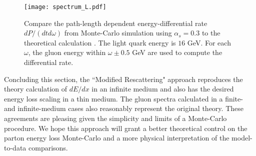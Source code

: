 \documentclass[aps, prc, reprint, amsmath, groupedaddress, nofootinbib]{revtex4-1}
\begin{document}
\begin{figure}
\texttt{[image: spectrum\_L.pdf]}
\caption{Compare the path-length dependent energy-differential rate $dP/(dtd\omega)$ from Monte-Carlo simulation using $\alpha_s = 0.3$ to the theoretical calculation \cite{CaronHuot:2008uh}. The light quark energy is $16$ GeV. For each $\omega$, the gluon energy within $\omega \pm 0.5$ GeV are used to compute the differential rate.}
\label{fig:spectra-L-alphas=0.3}
\end{figure}

Concluding this section, the ``Modified Rescattering" approach reproduces  the theory calculation of $dE/dx$ in an infinite medium and also has the desired energy loss scaling in a thin medium.
The gluon spectra calculated in a finite- and infinite-medium cases also reasonably represent the original theory.
These agreements are pleasing given the simplicity and limits of a Monte-Carlo procedure. 
We hope this approach will grant a better theoretical control on the parton energy loss Monte-Carlo and a more physical interpretation of the model-to-data comparisons.
\end{document}
